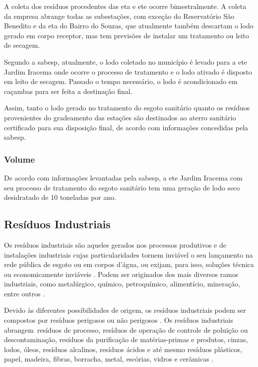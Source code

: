 	
	A coleta dos resíduos procedentes das \gls{eta} e \gls{ete} ocorre bimestralmente. A coleta da empresa abrange todas as subestações, com exceção do Reservatório São Benedito e da \gls{eta} do Bairro do Souzas, que atualmente também descartam o lodo gerado em corpo receptor, mas tem previsões de instalar um tratamento ou leito de secagem.
	
	Segundo a \gls{sabesp}, atualmente, o lodo coletado no município é levado para a \gls{ete} Jardim Iracema onde ocorre o processo de tratamento e o lodo ativado é disposto em leito de secagem. Passado o tempo necessário, o lodo é acondicionado em caçambas para ser feita a destinação final.
	
	Assim, tanto o lodo gerado no tratamento do esgoto sanitário quanto os resíduos provenientes do gradeamento das estações são destinados ao aterro sanitário certificado para sua disposição final, de acordo com informações concedidas pela \gls{sabesp}. 
	
	\subsubsection{Volume}
	De acordo com informações levantadas pela \gls{sabesp}, a \gls{ete} Jardim Iracema com seu processo de tratamento do esgoto sanitário tem uma geração de lodo seco desidratado de 10 toneladas por ano.
	
	\subsection{Resíduos Industriais}
	
	Os resíduos industriais são aqueles gerados nos processos produtivos e de instalações industriais cujas particularidades tornem inviável o seu lançamento na rede pública de esgoto ou em corpos d’água, ou exijam, para isso, soluções técnica ou economicamente inviáveis \cite{brasil:12305, conama:313}. Podem ser originados dos mais diversos ramos industriais, como metalúrgico, químico, petroquímico, alimentício, mineração, entre outros \cite{IPEA2012b}.
	
	Devido às diferentes possibilidades de origem, os resíduos industriais podem ser compostos por resíduos perigosos ou não perigosos \cite{conama:313}. Os resíduos industriais abrangem resíduos de processo, resíduos de operação de controle de poluição ou descontaminação, resíduos da purificação de matérias-primas e produtos, cinzas, lodos, óleos, resíduos alcalinos, resíduos ácidos e até mesmo resíduos plásticos, papel, madeira, fibras, borracha, metal, escórias, vidros e cerâmicas \cite{IPEA2012b}.
	
